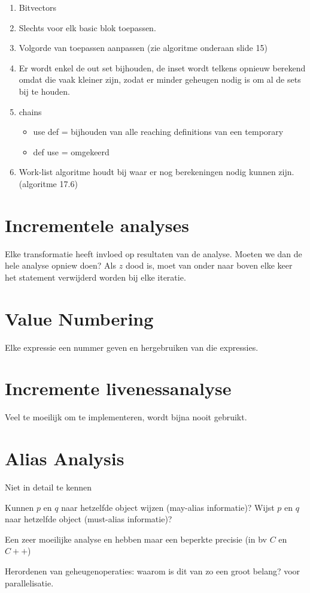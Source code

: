 \begin{enumerate}
	\item Bitvectors
	\item Slechts voor elk basic blok toepassen.
	\item Volgorde van toepassen aanpassen (zie algoritme onderaan slide 15)
	\item Er wordt enkel de out set bijhouden, de inset wordt telkens opnieuw berekend omdat die vaak kleiner zijn, zodat er minder geheugen nodig is om al de sets bij te houden.
	\item chains 
	\begin{itemize}
		\item use def  = bijhouden van alle reaching definitions van een temporary
		\item def use = omgekeerd
	\end{itemize}
	\item Work-list algoritme houdt bij waar er nog berekeningen nodig kunnen zijn. (algoritme 17.6)
\end{enumerate}

\section{Incrementele analyses}
Elke transformatie heeft invloed op resultaten van de analyse. Moeten we dan de hele analyse opniew doen? Als $z$ dood is, moet van onder naar boven elke keer het statement verwijderd worden bij elke iteratie.

\section{Value Numbering}
Elke expressie een nummer geven en hergebruiken van die expressies.

\section{Incremente livenessanalyse}
Veel te moeilijk om te implementeren, wordt bijna nooit gebruikt.

\section{Alias Analysis}
Niet in detail te kennen

Kunnen $p$ en $q$ naar hetzelfde object wijzen (may-alias informatie)?
Wijst $p$ en $q$ naar hetzelfde object (must-alias informatie)? 

Een zeer moeilijke analyse en hebben maar een beperkte precisie (in bv $C$ en $C++$)

Herordenen van geheugenoperaties: waarom is dit van zo een groot belang? voor parallelisatie.